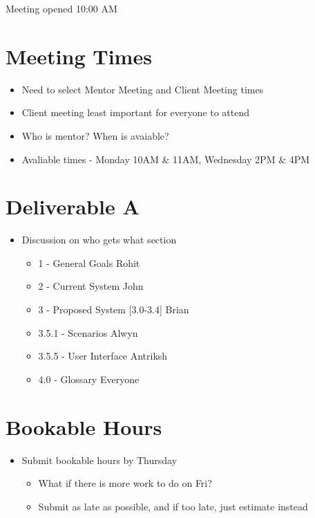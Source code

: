 
\date{8th August, 2011}
\absent{-}


\maketitle{}

Meeting opened 10:00 AM

\section{Meeting Times}
\begin{itemize}
\item Need to select Mentor Meeting and Client Meeting times
\item Client meeting least important for everyone to attend
\item Who is mentor? When is avaiable?
\item Avaliable times - Monday 10AM \& 11AM, Wednesday 2PM \& 4PM
\end{itemize}

\section{Deliverable A}
\begin{itemize}
\item Discussion on who gets what section
 \begin{itemize}
 \item 1 - General Goals
 \actioned Rohit
 \item 2 - Current System
 \actioned John
 \item 3 - Proposed System [3.0-3.4]
 \actioned Brian
 \item 3.5.1 - Scenarios
 \actioned Alwyn
 \item 3.5.5 - User Interface
 \actioned Antriksh
 \item 4.0 - Glossary
 \actioned Everyone
 \end{itemize}
\end{itemize}

\section{Bookable Hours}
\begin{itemize}
\item Submit bookable hours by Thursday
 \begin{itemize}
 \item What if there is more work to do on Fri?
 \item Submit as late as possible, and if too late, just estimate instead
 \end{itemize}
\end{itemize}

